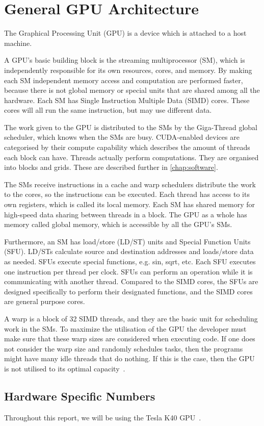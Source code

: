 \section{General GPU Architecture}
\label{sec:gpu}

The Graphical Processing Unit (GPU) is a device which is attached to a host machine.

A GPU's basic building block is the streaming multiprocessor (SM), which is independently responsible for its own resources, cores, and memory.
By making each SM independent memory access and computation are performed faster, because there is not global memory or special units that are shared among all the hardware.
Each SM has Single Instruction Multiple Data (SIMD) cores.
These cores will all run the same instruction, but may use different data.

The work given to the GPU is distributed to the SMs by the Giga-Thread global scheduler, which knows when the SMs are busy.
CUDA-enabled devices are categorised by their compute capability which describes the amount of threads each block can have.
Threads actually perform computations.
They are organised into blocks and grids.
These are described further in \cref{chap:software}.

The SMs receive instructions in a cache and warp schedulers distribute the work to the cores, so the instructions can be executed.
Each thread has access to its own registers, which is called its local memory.
Each SM has shared memory for high-speed data sharing between threads in a block.
The GPU as a whole has memory called global memory, which is accessible by all the GPU's SMs.

Furthermore, an SM has load/store (LD/ST) units and Special Function Units (SFU).
LD/STs calculate source and destination addresses and loads/store data as needed.
SFUs execute special functions, e.g. sin, sqrt, etc.
Each SFU executes one instruction per thread per clock.
SFUs can perform an operation while it is communicating with another thread.
Compared to the SIMD cores, the SFUs are designed specifically to perform their designated functions, and the SIMD cores are general purpose cores.

A warp is a block of 32 SIMD threads, and they are the basic unit for scheduling work in the SMs.
To maximize the utilisation of the GPU the developer must make sure that these warp sizes are considered when executing code.
If one does not consider the warp size and randomly schedules tasks, then the programs might have many idle threads that do nothing.
If this is the case, then the GPU is not utilised to its optimal capacity~\cite{fermi2009nvidia}.

\subsection{Hardware Specific Numbers}
\label{sec:hardware specific numbers}

Throughout this report, we will be using the Tesla K40 GPU~\cite{teslak402013nvidia}.
